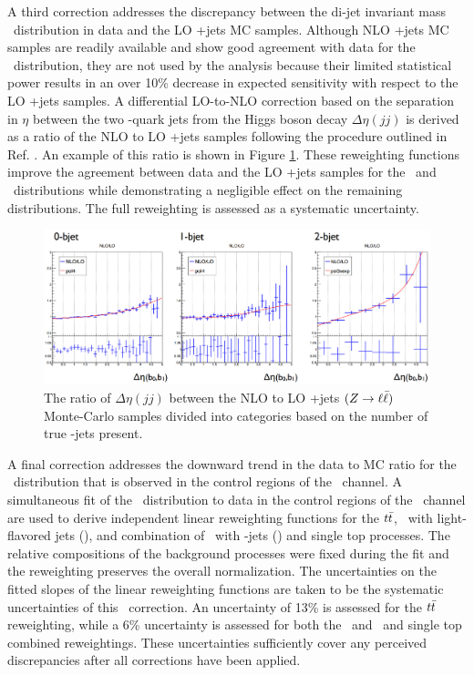 A third correction addresses the discrepancy between the di-jet invariant mass \mjj\ distribution in data and the LO \bosV+jets MC samples. Although NLO \bosV+jets MC samples are readily available and show good agreement with data for the \mjj\ distribution, they are not used by the analysis because their limited statistical power results in an over 10\% decrease in expected sensitivity with respect to the LO \bosV+jets samples. A differential LO-to-NLO correction based on the separation in $\eta$ between the two \qrkb-quark jets from the Higgs boson decay $\Delta\eta(jj)$ is derived as a ratio of the NLO to LO \bosV+jets samples following the procedure outlined in Ref. \cite{CMSVHbbEvidence}. An example of this ratio is shown in Figure \ref{fig:NLOtoLOratio}. These reweighting functions improve the agreement between data and the LO \bosV+jets samples for the \mjj\ and \pTV\ distributions while demonstrating a negligible effect on the remaining distributions. The full reweighting is assessed as a systematic uncertainty.

\begin{figure}[htbp]
  \centering
    \includegraphics[width=6in]{images/NLOtoLO}
    \caption[NLO to LO Ratio of $\Delta\eta(jj)$ for \bosZ+jets $(\bosZ \rightarrow \ell\bar{\ell})$ Samples]{The ratio of $\Delta\eta(jj)$ between the NLO to LO \bosZ+jets $(\bosZ \rightarrow \ell\bar{\ell})$ Monte-Carlo samples divided into categories based on the number of true \qrkb-jets present.}
    \label{fig:NLOtoLOratio}
\end{figure}

A final correction addresses the downward trend in the data to MC ratio for the \pTV\ distribution that is observed in the control regions of the \WlnH\ channel. A simultaneous fit of the \pTV\ distribution to data in the control regions of the \WlnH\ channel are used to derive independent linear reweighting functions for the $t\bar{t}$, \bosW\ with light-flavored jets (\Wlight), and combination of \bosW\ with \qrkb-jets (\Wbb) and single top processes. The relative compositions of the background processes were fixed during the fit and the reweighting preserves the overall normalization. The uncertainties on the fitted slopes of the linear reweighting functions are taken to be the systematic uncertainties of this \pTV\ correction. An uncertainty of 13\% is assessed for the $t\bar{t}$ reweighting, while a 6\% uncertainty is assessed for both the \Wlight\ and \Wbb\ and single top combined reweightings. These uncertainties sufficiently cover any perceived discrepancies after all corrections have been applied.

